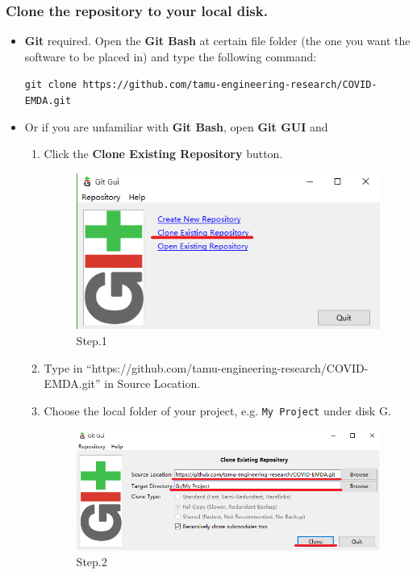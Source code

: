 \documentclass[11pt]{article}
\numberwithin{equation}{section}
\numberwithin{table}{section}
\numberwithin{figure}{section}
\begin{document}
\subsubsection{Clone the repository to your local disk.}
    \begin{itemize}
        \item \textbf{Git} required. Open the \textbf{Git Bash} at certain file folder (the one you want the software to be placed in) and type the following command:

\verb!git clone https://github.com/tamu-engineering-research/COVID-EMDA.git!

        \item Or if you are unfamiliar with \textbf{Git Bash}, open \textbf{Git GUI} and 
        \begin{enumerate}
            \item Click the \textbf{Clone Existing Repository} button.
            
            \begin{figure}[htbp]
                \centering
                \caption{Step.1}
                \includegraphics[width=.7\textwidth]{figures/git_gui_step_1.png}
            \end{figure}

            \item Type in ``https://github.com/tamu-engineering-research/COVID-EMDA.git'' in Source Location.
            \item Choose the local folder of your project, e.g. \verb!My Project! under disk G.
            
            \begin{figure}[htbp]
                \centering
                \caption{Step.2}
                \includegraphics[width=.7\textwidth]{figures/git_gui_step_2.png}
            \end{figure}


\end{enumerate}
\end{itemize}
\end{document}

